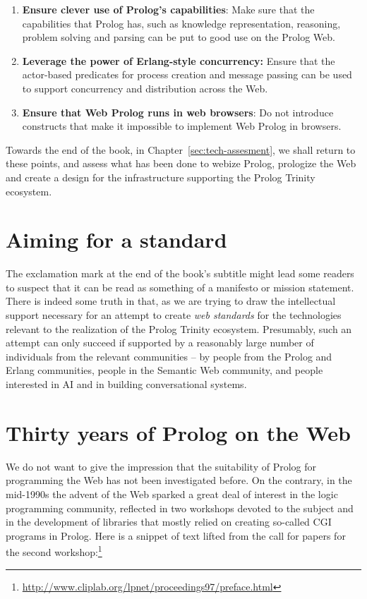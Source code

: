 \begin{enumerate}
\def\labelenumi{\arabic{enumi}.}
\item
  \textbf{Ensure clever use of Prolog's capabilities}: Make sure that the capabilities that Prolog has, such as knowledge representation, reasoning, problem solving and parsing can be put to good use on the Prolog Web. 
\item  
  \textbf{Leverage the power of Erlang-style concurrency\textbf{}:} Ensure that the actor-based
  predicates for process creation and message passing can be used to support
  concurrency and distribution across the Web.
\item
  \textbf{Ensure that Web Prolog runs in web browsers}: Do not introduce constructs that make it impossible to implement Web Prolog in browsers.
\end{enumerate}

\noindent Towards the end of the book, in Chapter~\ref{sec:tech-assesment}, we shall return to these points, and assess what has been done to webize Prolog, prologize the Web and create a design for the infrastructure supporting the Prolog Trinity ecosystem.

\section{Aiming for a standard}

The exclamation mark at the end of the book's subtitle might lead some readers to suspect that it can be read as something of a manifesto or mission statement. There is indeed some truth in that, as we are trying to draw the intellectual support necessary for an attempt to create \textit{web standards} for the technologies relevant to the realization of the Prolog Trinity ecosystem. Presumably, such an attempt can only succeed if supported by a reasonably large number of individuals from the relevant communities -- by people from the Prolog and Erlang communities, people in the Semantic Web community, and people interested in AI and in building conversational systems.


\section{Thirty years of Prolog on the Web}\label{sec:prolog-on-the-web}

We do not want to give the impression that the suitability of Prolog for programming the Web has not been investigated before. On the contrary, in the mid-1990s the advent of the Web sparked a great deal of interest in the logic programming community, reflected in two workshops devoted to the subject and in the development of libraries that mostly relied on creating so-called CGI programs in Prolog. Here is a snippet of text lifted from the call for papers for the second workshop:\footnote{\url{http://www.cliplab.org/lpnet/proceedings97/preface.html}}

